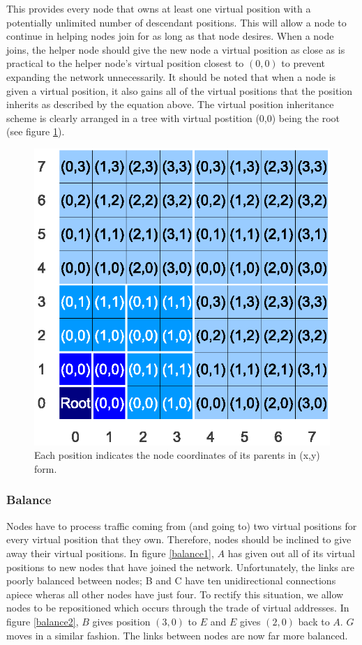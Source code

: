 \documentclass[ %
                    author={Luke Murray},
                supervisor={Dr. Simon Hollis},
                     title={Shadow Peer-to-Peer Networks},
                  subtitle={},
                    degree={MEng},
                      year={2013} ]{thesis}
\begin{document}
This provides every node that owns at least one virtual position with a potentially unlimited number of descendant positions. This will allow a node to continue in helping nodes join for as long as that node desires. When a node joins, the helper node should give the new node a virtual position as close as is practical to the helper node's virtual position closest to $(0, 0)$ to prevent expanding the network unnecessarily. It should be noted that when a node is given a virtual position, it also gains all of the virtual positions that the position inherits as described by the equation above. The virtual position inheritance scheme is clearly arranged in a tree with virtual postition (0,0) being the root (see figure \ref{tree}).

\begin{figure}[h]
    \centering
    \includegraphics{diagrams/network_tree.eps}
    \caption{Each position indicates the node coordinates of its parents in (x,y) form.}
    \label{tree}
\end{figure}

\subsubsection{Balance}

Nodes have to process traffic coming from (and going to) two virtual positions for every virtual position that they own. Therefore, nodes should be inclined to give away their virtual positions. In figure \ref{balance1}, $A$ has given out all of its virtual positions to new nodes that have joined the network. Unfortunately, the links are poorly balanced between nodes; B and C have ten unidirectional connections apiece wheras all other nodes have just four. To rectify this situation, we allow nodes to be repositioned which occurs through the trade of virtual addresses. In figure \ref{balance2}, $B$ gives position $(3,0)$ to $E$ and $E$ gives $(2,0)$ back to $A$. $G$ moves in a similar fashion. The links between nodes are now far more balanced. 
\end{document}
